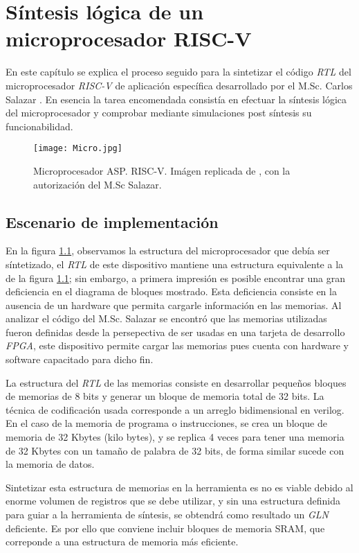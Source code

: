 \chapter{Síntesis lógica de un microprocesador RISC-V}
\label{ch:asp_syn}

En este capítulo se explica el proceso seguido para la sintetizar el código \textit{RTL} del microprocesador \textit{RISC-V} de aplicación específica desarrollado por el M.Sc. Carlos Salazar \cite{Carlosthesis}. En esencia la tarea encomendada consistía en efectuar la síntesis lógica del microprocesador y comprobar mediante simulaciones post síntesis su funcionabilidad.

\begin{figure}[t]
\texttt{[image: Micro.jpg]}
\centering
\caption{Microprocesador ASP. RISC-V. Imágen replicada de \cite{Carlosthesis}, con la autorización del M.Sc Salazar.}
\label{fig:micro}
\end{figure}

\section{Escenario de implementación}

En la figura \ref{fig:micro}, observamos la estructura del microprocesador que debía ser síntetizado, el \textit{RTL} de este dispositivo mantiene una estructura equivalente a la de la figura \ref{fig:micro}; sin embargo, a primera impresión es posible encontrar una gran deficiencia en el diagrama de bloques mostrado. Esta deficiencia consiste en la ausencia de un hardware que permita cargarle información en las memorias. Al analizar el código del M.Sc. Salazar se encontró que las memorias utilizadas fueron definidas desde la persepectiva de ser usadas en una tarjeta de desarrollo \textit{FPGA}, este dispositivo permite cargar las memorias pues cuenta con hardware y software capacitado para dicho fin.

La estructura del \textit{RTL} de las memorias consiste en desarrollar pequeños bloques de memorias de 8 bits y generar un bloque de memoria total de 32 bits. La técnica de codificación usada corresponde a un arreglo bidimensional en verilog. En el caso de la memoria de programa o instrucciones, se crea un bloque de memoria de 32 Kbytes (kilo bytes), y se replica 4 veces para tener una memoria de 32 Kbytes con un tamaño de palabra de 32 bits, de forma similar sucede con la memoria de datos.

Sintetizar esta estructura de memorias en la herramienta es no es viable debido al enorme volumen de registros que se debe utilizar, y sin una estructura definida para guiar a la herramienta de síntesis, se obtendrá como resultado un \textit{GLN} deficiente. Es por ello que conviene incluir bloques de memoria SRAM, que correponde a una estructura de memoria más eficiente.


